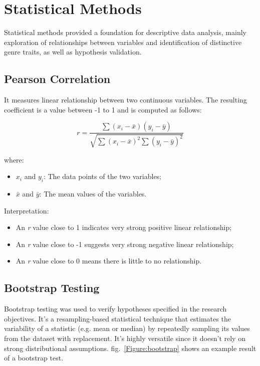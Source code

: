 \section{Statistical Methods}
\label{sec:statisticalmethods}

Statistical methods provided a foundation for descriptive data analysis, mainly
exploration of relationships between variables and identification of distinctive
genre traits, as well as hypothesis validation.

\subsection{Pearson Correlation}

It measures linear relationship between two continuous variables. The resulting
coefficient is a value between -1 to 1 and is computed as follows: 

\[
r = \frac{\sum{(x_i - \bar{x})(y_i - \bar{y})}}{\sqrt{\sum{(x_i - \bar{x})^2} \sum{(y_i - \bar{y})^2}}}
\]

\noindent \noindent where:
\begin{itemize}
    \item \( x_i \) and \( y_i \): The data points of the two variables;
    \item \( \bar{x} \) and \( \bar{y} \): The mean values of the variables.
\end{itemize}

\noindent \noindent Interpretation:
\begin{itemize}
  \item An \textit{r} value close to 1 indicates very strong positive linear
    relationship;
  \item An \textit{r} value close to -1 suggests very strong negative linear
    relationship;
  \item An \textit{r} value close to 0 means there is little to no relationship.
\end{itemize}



\subsection{Bootstrap Testing}

Bootstrap testing was used to verify hypotheses specified in the research
objectives. It's a resampling-based statistical technique that estimates the
variability of a statistic (e.g. mean or median)  by repeatedly sampling its
values from the dataset with replacement. It's highly versatile since it
doesn't rely on strong distributional assumptions. fig.~\ref{Figure:bootstrap}
shows an example result of a bootstrap test.


